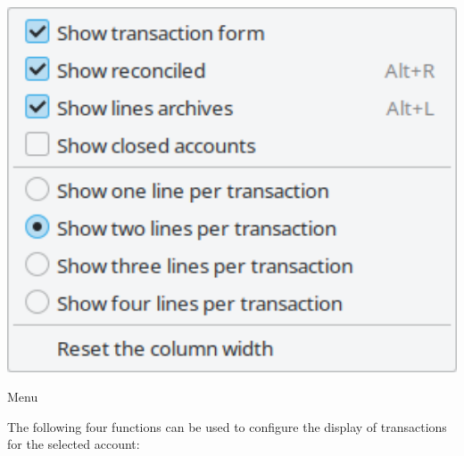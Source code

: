 \begin{minipage}{.3\linewidth}
	\centering						%
		\includegraphics[width=1\textwidth]{image/screenshot/home_menubar_view}
	\vspace{-20pt}					%
	\captionsetup{
	type=figure,%
	name=Fig.,%
	labelsep=newline}			%
	\caption{ Menu}		%
	\label{home_menubar_view}
\end{minipage}
\vspace{2mm}
\begin{addmargin*}[0pt]{.7cm} 	%
	The following four functions can be used to configure the display of transactions for the selected account:
\end{addmargin*}
\vspace{-2mm}
